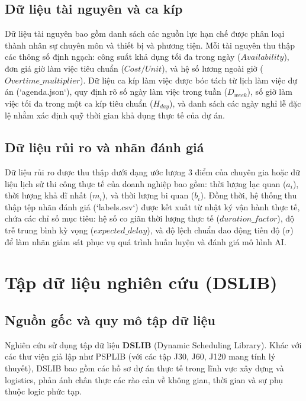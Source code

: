 \subsection{Dữ liệu tài nguyên và ca kíp}
Dữ liệu tài nguyên bao gồm danh sách các nguồn lực hạn chế được phân loại thành nhân sự chuyên môn và thiết bị và phương tiện. Mỗi tài nguyên thu thập các thông số định ngạch: công suất khả dụng tối đa trong ngày ($Availability$), đơn giá giờ làm việc tiêu chuẩn ($Cost/Unit$), và hệ số lương ngoài giờ ($Overtime\_multiplier$).
Dữ liệu ca kíp làm việc được bóc tách từ lịch làm việc dự án (`agenda.json`), quy định rõ số ngày làm việc trong tuần ($D_{week}$), số giờ làm việc tối đa trong một ca kíp tiêu chuẩn ($H_{day}$), và danh sách các ngày nghỉ lễ đặc lệ nhằm xác định quỹ thời gian khả dụng thực tế của dự án.

\subsection{Dữ liệu rủi ro và nhãn đánh giá}
Dữ liệu rủi ro được thu thập dưới dạng ước lượng 3 điểm của chuyên gia hoặc dữ liệu lịch sử thi công thực tế của doanh nghiệp bao gồm: thời lượng lạc quan ($a_i$), thời lượng khả dĩ nhất ($m_i$), và thời lượng bi quan ($b_i$). 
Đồng thời, hệ thống thu thập tệp nhãn đánh giá (`labels.csv`) được kết xuất từ nhật ký vận hành thực tế, chứa các chỉ số mục tiêu: hệ số co giãn thời lượng thực tế ($duration\_factor$), độ trễ trung bình kỳ vọng ($expected\_delay$), và độ lệch chuẩn dao động tiến độ ($\sigma$) để làm nhãn giám sát phục vụ quá trình huấn luyện và đánh giá mô hình AI.

\section{Tập dữ liệu nghiên cứu (DSLIB)}
\label{sec:2.4_dslib_dataset}

\subsection{Nguồn gốc và quy mô tập dữ liệu}
Nghiên cứu sử dụng tập dữ liệu \textbf{DSLIB} (Dynamic Scheduling Library). Khác với các thư viện giả lập như PSPLIB (với các tập J30, J60, J120 mang tính lý thuyết), DSLIB bao gồm các hồ sơ dự án thực tế trong lĩnh vực xây dựng và logistics, phản ánh chân thực các rào cản về không gian, thời gian và sự phụ thuộc logic phức tạp.

